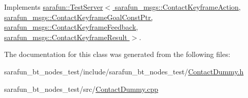 Implements \hyperlink{classsarafun_1_1TestServer_a85b9721105c2a4b46bae26428433513e}{sarafun\-::\-Test\-Server$<$ sarafun\-\_\-msgs\-::\-Contact\-Keyframe\-Action, sarafun\-\_\-msgs\-::\-Contact\-Keyframe\-Goal\-Const\-Ptr, sarafun\-\_\-msgs\-::\-Contact\-Keyframe\-Feedback, sarafun\-\_\-msgs\-::\-Contact\-Keyframe\-Result $>$}.



The documentation for this class was generated from the following files\-:\begin{DoxyCompactItemize}
\item 
sarafun\-\_\-bt\-\_\-nodes\-\_\-test/include/sarafun\-\_\-bt\-\_\-nodes\-\_\-test/\hyperlink{ContactDummy_8h}{Contact\-Dummy.\-h}\item 
sarafun\-\_\-bt\-\_\-nodes\-\_\-test/src/\hyperlink{ContactDummy_8cpp}{Contact\-Dummy.\-cpp}\end{DoxyCompactItemize}
